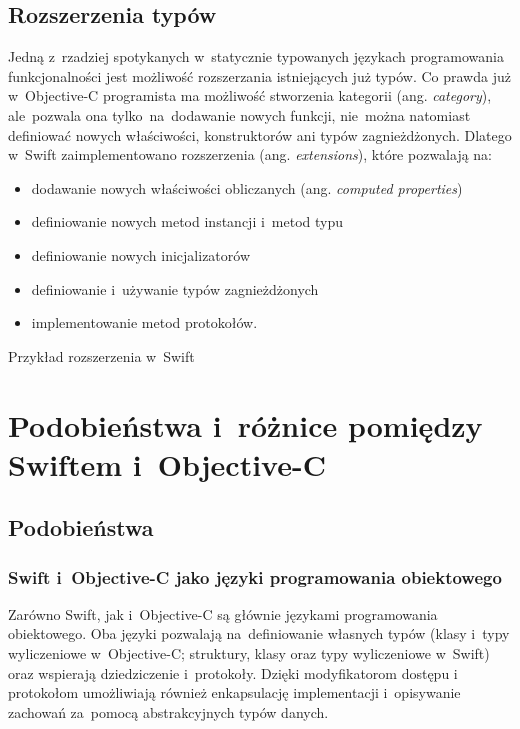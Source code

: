 \documentclass[mgr, shortabstract]{iithesis}
\newcommand{\ang}[1]{ang. \textit{#1}}
\newcommand{\swiftlisting}[2]{
    \swiftcode{src/#1.swift}
    \begin{listing}[ht]
      \caption{#2}
      \label{l:#1}
    \end{listing}
}
\begin{document}
\section{Rozszerzenia typów}
\label{s:rozszerzenia_typow}

Jedną z~rzadziej spotykanych w~statycznie typowanych językach programowania funkcjonalności jest możliwość rozszerzania istniejących już typów. Co prawda już w~Objective-C programista ma możliwość stworzenia kategorii (\ang{category}), ale~pozwala ona tylko~na~dodawanie nowych funkcji, nie~można natomiast definiować nowych właściwości, konstruktorów ani typów zagnieżdżonych. Dlatego w~Swift zaimplementowano rozszerzenia (\ang{extensions}), które pozwalają na:

\begin{itemize}
    \item dodawanie nowych właściwości obliczanych (\ang{computed properties})
    \item definiowanie nowych metod instancji i~metod typu
    \item definiowanie nowych inicjalizatorów
    \item definiowanie i~używanie typów zagnieżdżonych
    \item implementowanie metod protokołów.
\end{itemize}

\swiftlisting{2_extension}{Przykład rozszerzenia w~Swift}

\chapter{Podobieństwa i~różnice pomiędzy Swiftem i~Objective-C}

\label{ch:swift-objc}

\section{Podobieństwa}

\subsection{Swift i~Objective-C jako języki programowania obiektowego}

Zarówno Swift, jak i~Objective-C są głównie językami programowania  obiektowego. Oba języki pozwalają na~definiowanie własnych typów (klasy i~typy wyliczeniowe w~Objective-C; struktury, klasy oraz typy wyliczeniowe w~Swift) oraz wspierają dziedziczenie i~protokoły. Dzięki modyfikatorom dostępu i protokołom umożliwiają również enkapsulację implementacji i~opisywanie zachowań za~pomocą abstrakcyjnych typów danych.
\end{document}
